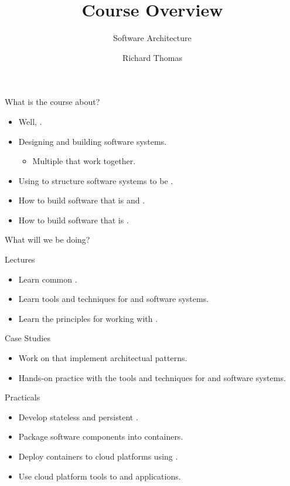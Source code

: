 \documentclass{slide}
\title{Course Overview}
\subtitle{Software Architecture}
\institute{University of Queensland}
\author{Richard Thomas}
\date{\week{1}}
\begin{document}
\maketitle

\begin{frame}{What is the course about?}
\Large
\begin{itemize}[<+->]
    \item Well, .
	\vspace{2mm}
    \item Designing and building software systems.
    \begin{itemize}
        \large \item Multiple  that work together.
    \end{itemize}
    \item Using  to structure software systems to be .
    \item How to build software that is  and .
    \item How to build software that is .
\end{itemize}
\end{frame}


\begin{frame}{What will we be doing?}

{\color{pine} Lectures}
\begin{itemize}[<+->]
    \item Learn common .
    \item Learn tools and techniques for  and  software systems.
    \item Learn the principles for working with .
\end{itemize}

{\color{pine} Case Studies}
\begin{itemize}[<+->]
    \item Work on  that implement architectual patterns.
    \item Hands-on practice with the tools and techniques for  and  software systems.
\end{itemize}

{\color{pine} Practicals}
\begin{itemize}[<+->]
    \item Develop stateless and persistent .
    \item Package software components into  containers.
    \item Deploy containers to cloud platforms using .
    \item Use cloud platform tools to  and  applications.
\end{itemize}

\end{frame}
\end{document}

